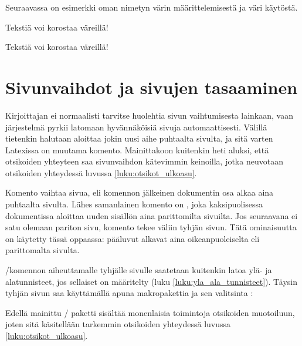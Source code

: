 Seuraavassa on esimerkki oman nimetyn värin määrittelemisestä ja väri
käytöstä.

\begin{koodilohkosis}
Tekstiä voi korostaa \textcolor{korostus}{väreillä}!
\end{koodilohkosis}

\begin{tulossis}
Tekstiä voi korostaa \textcolor{korostus}{väreillä}!
\end{tulossis}

\section{Sivunvaihdot ja sivujen tasaaminen}
\label{luku:sivunvaihdot}

Kirjoittajan ei normaalisti tarvitse huolehtia sivun vaihtumisesta
lainkaan, vaan järjestelmä pyrkii latomaan hyvännäköisiä sivuja
automaattisesti. Välillä tietenkin halutaan aloittaa jokin uusi aihe
puhtaalta sivulta, ja sitä varten Latexissa on muutama komento.
Mainittakoon kuitenkin heti aluksi, että otsikoiden yhteyteen saa
sivunvaihdon kätevimmin keinoilla, jotka neuvotaan otsikoiden yhteydessä
luvussa \ref{luku:otsikot_ulkoasu}.

Komento  vaihtaa sivua, eli komennon jälkeinen
dokumentin osa alkaa aina puhtaalta sivulta. Lähes samanlainen komento
on , joka kaksipuolisessa dokumentissa
aloittaa uuden sisällön aina parittomilta sivuilta. Jos seuraavana ei
satu olemaan pariton sivu, komento tekee väliin tyhjän sivun. Tätä
ominaisuutta on käytetty tässä oppaassa: pääluvut alkavat aina
oikeanpuoleiselta eli parittomalta sivulta.

\-/komennon aiheuttamalle tyhjälle sivulle
saatetaan kuitenkin latoa ylä- ja alatunnisteet, jos sellaiset on
määritelty (luku \ref{luku:yla_ala_tunnisteet}). Täysin tyhjän sivun saa
käyttämällä apuna makropakettia  ja
sen valitsinta :

\begin{koodilohkosis}
\usepackage[clearempty]{titlesec}
\end{koodilohkosis}

Edellä mainittu \-/ paketti sisältää monenlaisia
toimintoja otsikoiden muotoiluun, joten sitä käsitellään tarkemmin
otsikoiden yhteydessä luvussa \ref{luku:otsikot_ulkoasu}.

